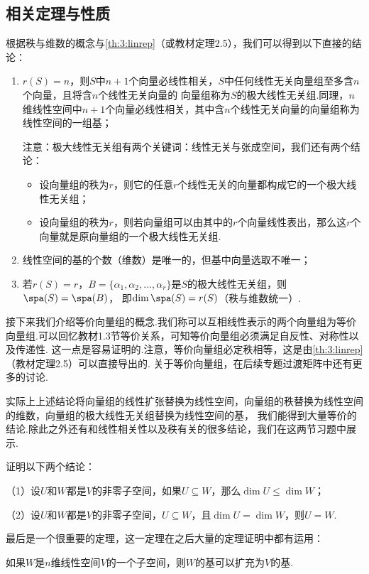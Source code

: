 \subsection{相关定理与性质}
根据秩与维数的概念与\autoref{th:3:linrep}（或教材定理2.5），我们可以得到以下直接的结论：
\begin{enumerate}
    \item $r(S)=n$，则$S$中$n+1$个向量必线性相关，$S$中任何线性无关向量组至多含$n$个向量，且将含$n$个线性无关向量的
    向量组称为$S$的极大线性无关组.同理，$n$维线性空间中$n+1$个向量必线性相关，其中含$n$个线性无关向量的向量组称为
    线性空间的一组基；

    注意：极大线性无关组有两个关键词：线性无关与张成空间，我们还有两个结论：
    \begin{itemize}
        \item 设向量组的秩为$r$，则它的任意$r$个线性无关的向量都构成它的一个极大线性无关组；
        \item 设向量组的秩为$r$，则若向量组可以由其中的$r$个向量线性表出，那么这$r$个向量就是原向量组的一个极大线性无关组.
    \end{itemize}

    \item 线性空间的基的个数（维数）是唯一的，但基中向量选取不唯一；

    \item 若$r(S)=r$，$B=\{\alpha_1,\alpha_2,\ldots,\alpha_r\}$是$S$的极大线性无关组，则$\spa(S)=\spa(B)$，
          即$\dim \spa(S)=r(S)$（秩与维数统一）.
\end{enumerate}
接下来我们介绍等价向量组的概念.我们称可以互相线性表示的两个向量组为等价向量组.可以回忆教材1.3节等价关系，可知等价向量组必须满足自反性、对称性以及传递性.
这一点是容易证明的.注意，等价向量组必定秩相等，这是由\autoref{th:3:linrep}（教材定理2.5）可以直接导出的.
关于等价向量组，在后续专题过渡矩阵中还有更多的讨论.

实际上上述结论将向量组的线性扩张替换为线性空间，向量组的秩替换为线性空间的维数，向量组的极大线性无关组替换为线性空间的基，
我们能得到大量等价的结论.除此之外还有和线性相关性以及秩有关的很多结论，我们在这两节习题中展示.
\begin{example}
	证明以下两个结论：

	\textup{（1）}设$U$和$W$都是$V$的非零子空间，如果$U\subseteq W$，那么$\dim U \leqslant \dim W$；

	\textup{（2）}设$U$和$W$都是$V$的非零子空间，$U\subseteq W$，且$\dim U = \dim W$，则$U = W$.
\end{example}
最后是一个很重要的定理，这一定理在之后大量的定理证明中都有运用：
\begin{theorem}
	如果$W$是$n$维线性空间$V$的一个子空间，则$W$的基可以扩充为$V$的基.
\end{theorem}

